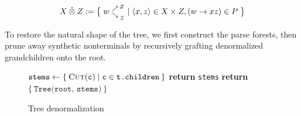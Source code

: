 \documentclass[sigplan,review,anonymous,acmsmall]{acmart}\settopmatter{printfolios=false,printccs=false,printacmref=false}
\begin{document}
\begin{align}
   X\:\hat{\otimes}\:Z := \big\{\;w\hphantom{.}^{\nearrow}_{\searrow}\nobarfrac{x}{z} \mid \langle x, z\rangle \in X \times Z, (w\rightarrow xz) \in P\;\big\}
\end{align}

\noindent To restore the natural shape of the tree, we first construct the parse forests, then prune away synthetic nonterminals by recursively grafting denormalized grandchildren onto the root.

\begin{figure}[H]
  \begin{minipage}{.45\linewidth}
    \begin{algorithm}[H]
      \caption{Tree denormalization}\label{alg:cap}
      \begin{algorithmic}
          \State $\texttt{stems} \leftarrow \{\:\textsc{Cut}(\texttt{c}) \mid \texttt{c} \in \texttt{t.children}\:\}$
            \State \textbf{return } \texttt{stems} %
          \Else%
            \State \textbf{return } $\{\:\texttt{Tree(root, stems)}\:\}$
          \EndIf
        \EndProcedure
      \end{algorithmic}
    \end{algorithm}
  \end{minipage}
\end{figure}
\end{document}
